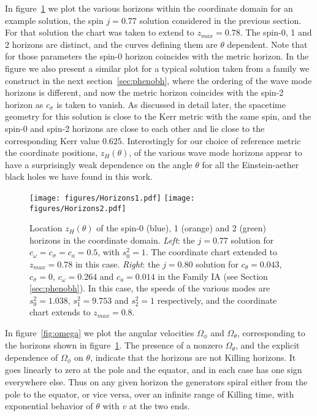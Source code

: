 \documentclass[12pt]{article}
\numberwithin{equation}{section}
\begin{document}
In figure~\ref{fig:horizons} we plot the various horizons within the coordinate domain for an example solution, the spin $j = 0.77$ solution considered in the previous section. For that solution the chart was taken to extend to $z_{max} = 0.78$. The spin-0, 1 and 2 horizons are distinct, and the curves defining them are $\theta$ dependent.
Note that for those parameters the spin-0 horizon coincides with the metric horizon. 
In the figure we also present a similar plot for a typical solution taken from a family we construct in the next section~\ref{sec:phenobh}, where the ordering of the wave mode horizons is different, and now the metric horizon coincides with the spin-2 horizon as $c_\sigma$ is taken to vanish.
As discussed in detail later, the spacetime geometry for this solution is close to the Kerr metric with the same spin, and the spin-0 and spin-2 horizons are close to each other and lie close to the corresponding Kerr value $0.625$. 
Interestingly for our choice of reference metric the coordinate positions, $z_H(\theta)$, of the various wave mode horizons appear to have a surprisingly weak dependence on the angle $\theta$ for all the Einstein-aether black holes we have found in this work.

%
\begin{figure}
\centerline{ 
  \texttt{[image: figures/Horizons1.pdf]}
  \hspace{0.1cm}
  \texttt{[image: figures/Horizons2.pdf]}
  }
  \caption{\label{fig:horizons} 
  Location $z_H(\theta)$ of the spin-0 (blue), 1 (orange) and 2 (green) horizons in the coordinate domain. \textit{Left}: the $j = 0.77$ solution for $c_\omega = c_\sigma = c_a = 0.5$, with $s_0^2 = 1$. The coordinate chart extended to $z_{max} = 0.78$ in this case. \textit{Right}: the $j=0.80$ solution for $c_\theta=0.043$, $c_\sigma=0$, $c_\omega=0.264$ and $c_a=0.014$ in the Family IA (see Section \ref{sec:phenobh}). In this case, the speeds of the various modes are $s_0^2=1.038$, $s_1^2=9.753$ and $s_2^2=1$ respectively, and the coordinate chart extends to $z_{max}=0.8$.
  }
\end{figure}
%



In figure~\ref{fig:omega} we plot the angular velocities 
$\Omega_\phi$ and $\Omega_\theta$, corresponding to the horizons shown in figure~\ref{fig:horizons}.
The presence of a nonzero $\Omega_\theta$,
and the explicit dependence of $\Omega_\phi$ on $\theta$, indicate
 that the horizons are not 
Killing horizons. It goes linearly to zero at the pole and the equator, and in each case has one sign everywhere else. Thus on any given horizon the generators spiral either from 
the pole to the equator, or vice versa, over an infinite range of Killing time, with exponential behavior of $\theta$ with $v$ at the two ends.
\end{document}
